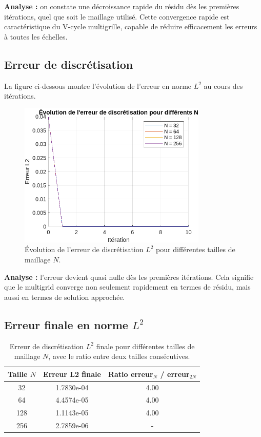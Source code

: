 \documentclass[12pt,a4paper]{article}
\begin{document}
\textbf{Analyse :} on constate une décroissance rapide du résidu dès les premières itérations, quel que soit le maillage utilisé. Cette convergence rapide est caractéristique du V-cycle multigrille, capable de réduire efficacement les erreurs à toutes les échelles.

\subsection{Erreur de discrétisation}
La figure ci-dessous montre l'évolution de l'erreur en norme $L^2$ au cours des itérations.

\begin{figure}[H]
    \centering
    \includegraphics[width=0.8\textwidth]{src/L2.png}
    \caption{Évolution de l'erreur de discrétisation $L^2$ pour différentes tailles de maillage $N$.}
\end{figure}

\textbf{Analyse :} l’erreur devient quasi nulle dès les premières itérations. Cela signifie que le multigrid converge non seulement rapidement en termes de résidu, mais aussi en termes de solution approchée.

\subsection{Erreur finale en norme $L^2$}

\begin{table}[H]
\centering
\begin{tabular}{|c|c|c|}
\hline
\rowcolor{gray!20} \textbf{Taille $N$} & \textbf{Erreur L2 finale} & \textbf{Ratio erreur$_N$ / erreur$_{2N}$} \\
\hline
32  & 1.7830e-04 & 4.00 \\
64  & 4.4574e-05 & 4.00 \\
128 & 1.1143e-05 & 4.00 \\
256 & 2.7859e-06 & - \\
\hline
\end{tabular}
\caption{Erreur de discrétisation $L^2$ finale pour différentes tailles de maillage $N$, avec le ratio entre deux tailles consécutives.}
\end{table}
\end{document}
